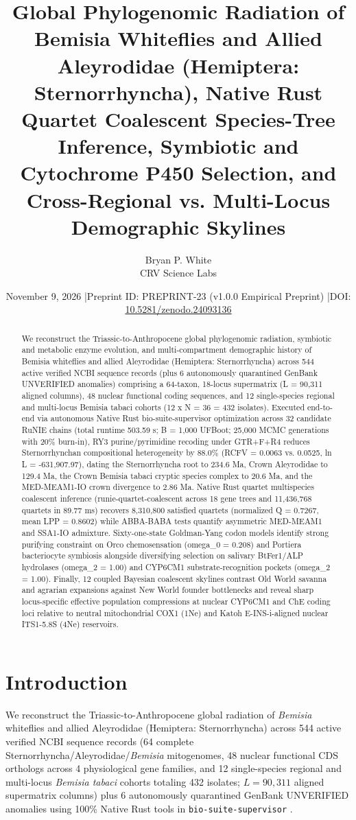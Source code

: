 \documentclass[10pt,letterpaper]{article}
\title{Global Phylogenomic Radiation of Bemisia Whiteflies and Allied Aleyrodidae (Hemiptera: Sternorrhyncha), Native Rust Quartet Coalescent Species-Tree Inference, Symbiotic and Cytochrome P450 Selection, and Cross-Regional vs. Multi-Locus Demographic Skylines}
\author{Bryan P. White \\ CRV Science Labs}
\date{November 9, 2026 \quad|\quad Preprint ID: PREPRINT-23 (v1.0.0 Empirical Preprint) \quad|\quad DOI: \href{https://doi.org/10.5281/zenodo.24093136}{10.5281/zenodo.24093136}}
\begin{document}
\maketitle
\begin{abstract}
We reconstruct the Triassic-to-Anthropocene global phylogenomic radiation, symbiotic and metabolic enzyme evolution, and multi-compartment demographic history of Bemisia whiteflies and allied Aleyrodidae (Hemiptera: Sternorrhyncha) across 544 active verified NCBI sequence records (plus 6 autonomously quarantined GenBank UNVERIFIED anomalies) comprising a 64-taxon, 18-locus supermatrix (L = 90,311 aligned columns), 48 nuclear functional coding sequences, and 12 single-species regional and multi-locus Bemisia tabaci cohorts (12 x N = 36 = 432 isolates). Executed end-to-end via autonomous Native Rust bio-suite-supervisor optimization across 32 candidate RuNIE chains (total runtime 503.59 s; B = 1,000 UFBoot; 25,000 MCMC generations with 20\% burn-in), RY3 purine/pyrimidine recoding under GTR+F+R4 reduces Sternorrhynchan compositional heterogeneity by 88.0\% (RCFV = 0.0063 vs. 0.0525, ln L = -631,907.97), dating the Sternorrhyncha root to 234.6 Ma, Crown Aleyrodidae to 129.4 Ma, the Crown Bemisia tabaci cryptic species complex to 20.6 Ma, and the MED-MEAM1-IO crown divergence to 2.86 Ma. Native Rust quartet multispecies coalescent inference (runie-quartet-coalescent across 18 gene trees and 11,436,768 quartets in 89.77 ms) recovers 8,310,800 satisfied quartets (normalized Q = 0.7267, mean LPP = 0.8602) while ABBA-BABA tests quantify asymmetric MED-MEAM1 and SSA1-IO admixture. Sixty-one-state Goldman-Yang codon models identify strong purifying constraint on Orco chemosensation (omega\_0 = 0.208) and Portiera bacteriocyte symbiosis alongside diversifying selection on salivary BtFer1/ALP hydrolases (omega\_2 = 1.00) and CYP6CM1 substrate-recognition pockets (omega\_2 = 1.00). Finally, 12 coupled Bayesian coalescent skylines contrast Old World savanna and agrarian expansions against New World founder bottlenecks and reveal sharp locus-specific effective population compressions at nuclear CYP6CM1 and ChE coding loci relative to neutral mitochondrial COX1 (1Ne) and Katoh E-INS-i-aligned nuclear ITS1-5.8S (4Ne) reservoirs.
\end{abstract}
\section{Introduction}
We reconstruct the Triassic-to-Anthropocene global radiation of \textit{Bemisia} whiteflies and allied Aleyrodidae (Hemiptera: Sternorrhyncha) across 544 active verified NCBI sequence records (64 complete Sternorrhyncha/Aleyrodidae/\textit{Bemisia} mitogenomes, 48 nuclear functional CDS orthologs across 4 physiological gene families, and 12 single-species regional and multi-locus \textit{Bemisia tabaci} cohorts totaling 432 isolates; $L = 90,311$ aligned supermatrix columns) plus 6 autonomously quarantined GenBank UNVERIFIED anomalies using 100\% Native Rust tools in \texttt{bio-suite-supervisor} \cite{ref1,ref5,ref7}.
\end{document}
